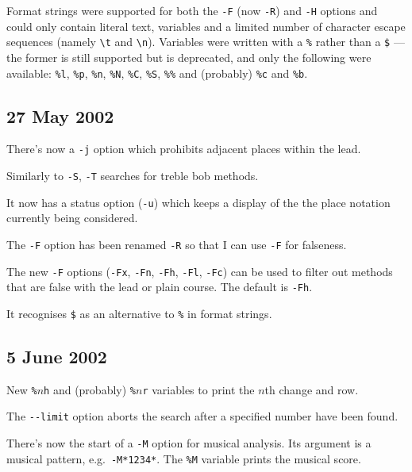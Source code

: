 \documentclass[a4paper,11pt,oneside]{book}
\begin{document}
Format strings were supported for both the \verb+-F+ (now \verb+-R+) and 
\verb+-H+ options and could only contain literal text, variables
and a limited number of character escape sequences (namely \verb+\t+ and 
\verb+\n+).
Variables were written with a \verb+%+ rather than a \verb+$+ — the former
is still supported but is deprecated, and only the following were available:
\verb+%l+, \verb+%p+, \verb+%n+, \verb+%N+, \verb+%C+, \verb+%S+, \verb+%%+ 
and (probably) \verb+%c+ and \verb+%b+.

\subsection{27 May 2002}
\begin{list}{}{\leftmargin=1em}
\item There's now a \verb+-j+ option which prohibits adjacent places 
within the lead.
\item Similarly to \verb+-S+, \verb+-T+ searches for treble bob methods.
\item It now has a status option (\verb+-u+) which keeps a display of the 
the place notation currently being considered.
\item The \verb+-F+ option has been renamed \verb+-R+ so that I can use 
\verb+-F+ for falseness.
\item The new \verb+-F+ options (\verb+-Fx+, \verb+-Fn+, \verb+-Fh+, 
\verb+-Fl+, \verb+-Fc+) can be used to filter out methods that are 
false with the lead or plain course.  The default is \verb+-Fh+.
\item It recognises \verb+$+ as an alternative to \verb+%+ in format strings.
\end{list}

\subsection{5 June 2002}
\begin{list}{}{\leftmargin=1em}
\item New \verb+%+$n$\verb+h+ and (probably) \verb+%+$n$\verb+r+ variables 
to print the $n$th change and row.
\item The \verb+--limit+ option aborts the search after a specified number
have been found.
\item There's now the start of a \verb+-M+ option for musical analysis.  Its 
argument is a musical pattern, e.g.\ \verb+-M*1234*+.  The \verb+%M+ variable
prints the musical score.
\end{list}
\end{document}
